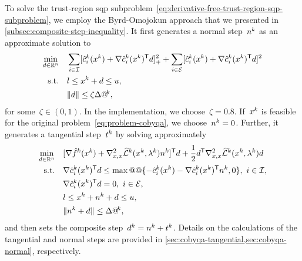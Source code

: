 To solve the trust-region \gls{sqp} subproblem~\cref{eq:derivative-free-trust-region-sqp-subproblem}, we employ the Byrd-Omojokun approach that we presented in \cref{subsec:composite-step-inequality}.
It first generates a normal step~$\nstep[k]$ as an approximate solution to
\begin{subequations}
    \label{eq:cobyqa-normal}
    \begin{align}
        \min_{\step \in \R^n}   & \quad \sum_{i \in \iub} \posp{\conm[k]{i}(\iter[k]) + \nabla \conm[k]{i}(\iter[k])^{\T} \step}^2 + \sum_{i \in \ieq} [\conm[k]{i}(\iter[k]) + \nabla \conm[k]{i}(\iter[k])^{\T} \step]^2 \label{eq:cobyqa-normal-obj}\\
        \text{s.t.}             & \quad \xl \le \iter[k] + \step \le \xu,\\
                                & \quad \norm{\step} \le \zeta \rad[k], \label{eq:cobyqa-normal-tr}
    \end{align}
\end{subequations}
for some~$\zeta \in (0, 1)$.
In the implementation, we choose~$\zeta = 0.8$.
If~$\iter[k]$ is feasible for the original problem~\cref{eq:problem-cobyqa}, we choose~$\nstep[k] = 0$.
Further, it generates a tangential step~$\tstep[k]$ by solving approximately
\begin{subequations}
    \label{eq:cobyqa-tangential-original}
    \begin{align}
        \min_{\step \in \R^n}   & \quad [\nabla \objm[k](\iter[k]) + \nabla_{x, x}^2 \lagm[k](\iter[k], \lm[k]) \nstep[k]]^{\T} \step + \frac{1}{2} \step^{\T} \nabla_{x, x}^2 \lagm[k](\iter[k], \lm[k]) \step\\
        \text{s.t.}             & \quad \nabla \conm[k]{i}(\iter[k])^{\T} \step \le \max @@ \set{-\conm[k]{i}(\iter[k]) - \nabla \conm[k]{i}(\iter[k])^{\T} \nstep[k], 0}, ~ i \in \iub, \label{eq:cobyqa-tangential-original-ub}\\
                                & \quad \nabla \conm[k]{i}(\iter[k])^{\T} \step = 0, ~ i \in \ieq,\\
                                & \quad \xl \le \iter[k] + \nstep[k] + \step \le \xu,\\
                                & \quad \norm{\nstep[k] + \step} \le \rad[k],
    \end{align}
\end{subequations}
and then sets the composite step~$\step[k] = \nstep[k] + \tstep[k]$.
Details on the calculations of the tangential and normal steps are provided in \cref{sec:cobyqa-tangential,sec:cobyqa-normal}, respectively.

